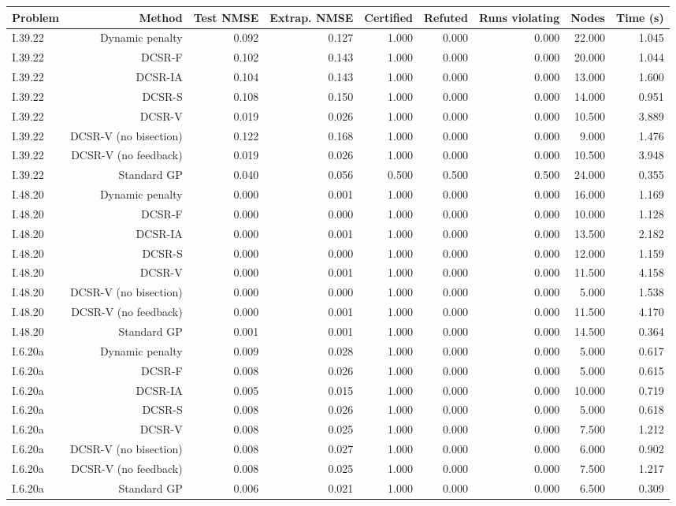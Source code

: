 \begin{tabular}{lrrrrrrrr}
\toprule
Problem & Method & Test NMSE & Extrap. NMSE & Certified & Refuted & Runs violating & Nodes & Time (s) \\
\midrule
I.39.22 & Dynamic penalty & 0.092 & 0.127 & 1.000 & 0.000 & 0.000 & 22.000 & 1.045 \\
I.39.22 & DCSR-F & 0.102 & 0.143 & 1.000 & 0.000 & 0.000 & 20.000 & 1.044 \\
I.39.22 & DCSR-IA & 0.104 & 0.143 & 1.000 & 0.000 & 0.000 & 13.000 & 1.600 \\
I.39.22 & DCSR-S & 0.108 & 0.150 & 1.000 & 0.000 & 0.000 & 14.000 & 0.951 \\
I.39.22 & DCSR-V & 0.019 & 0.026 & 1.000 & 0.000 & 0.000 & 10.500 & 3.889 \\
I.39.22 & DCSR-V (no bisection) & 0.122 & 0.168 & 1.000 & 0.000 & 0.000 & 9.000 & 1.476 \\
I.39.22 & DCSR-V (no feedback) & 0.019 & 0.026 & 1.000 & 0.000 & 0.000 & 10.500 & 3.948 \\
I.39.22 & Standard GP & 0.040 & 0.056 & 0.500 & 0.500 & 0.500 & 24.000 & 0.355 \\
I.48.20 & Dynamic penalty & 0.000 & 0.001 & 1.000 & 0.000 & 0.000 & 16.000 & 1.169 \\
I.48.20 & DCSR-F & 0.000 & 0.000 & 1.000 & 0.000 & 0.000 & 10.000 & 1.128 \\
I.48.20 & DCSR-IA & 0.000 & 0.001 & 1.000 & 0.000 & 0.000 & 13.500 & 2.182 \\
I.48.20 & DCSR-S & 0.000 & 0.000 & 1.000 & 0.000 & 0.000 & 12.000 & 1.159 \\
I.48.20 & DCSR-V & 0.000 & 0.001 & 1.000 & 0.000 & 0.000 & 11.500 & 4.158 \\
I.48.20 & DCSR-V (no bisection) & 0.000 & 0.000 & 1.000 & 0.000 & 0.000 & 5.000 & 1.538 \\
I.48.20 & DCSR-V (no feedback) & 0.000 & 0.001 & 1.000 & 0.000 & 0.000 & 11.500 & 4.170 \\
I.48.20 & Standard GP & 0.001 & 0.001 & 1.000 & 0.000 & 0.000 & 14.500 & 0.364 \\
I.6.20a & Dynamic penalty & 0.009 & 0.028 & 1.000 & 0.000 & 0.000 & 5.000 & 0.617 \\
I.6.20a & DCSR-F & 0.008 & 0.026 & 1.000 & 0.000 & 0.000 & 5.000 & 0.615 \\
I.6.20a & DCSR-IA & 0.005 & 0.015 & 1.000 & 0.000 & 0.000 & 10.000 & 0.719 \\
I.6.20a & DCSR-S & 0.008 & 0.026 & 1.000 & 0.000 & 0.000 & 5.000 & 0.618 \\
I.6.20a & DCSR-V & 0.008 & 0.025 & 1.000 & 0.000 & 0.000 & 7.500 & 1.212 \\
I.6.20a & DCSR-V (no bisection) & 0.008 & 0.027 & 1.000 & 0.000 & 0.000 & 6.000 & 0.902 \\
I.6.20a & DCSR-V (no feedback) & 0.008 & 0.025 & 1.000 & 0.000 & 0.000 & 7.500 & 1.217 \\
I.6.20a & Standard GP & 0.006 & 0.021 & 1.000 & 0.000 & 0.000 & 6.500 & 0.309 \\
\bottomrule
\end{tabular}
